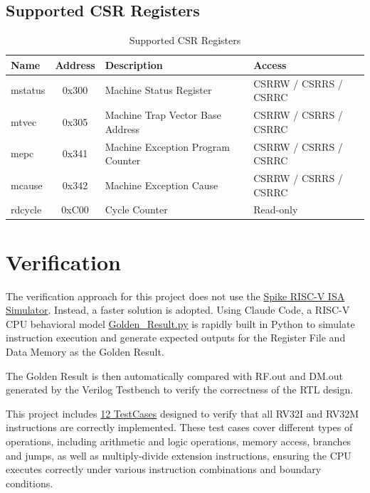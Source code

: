 \documentclass[12pt,a4paper]{report}
\begin{document}
\subsection{Supported CSR Registers}

\begin{table}[htbp]
\centering
\caption{Supported CSR Registers}
\begin{tabular}{|l|c|l|l|}
\hline
\textbf{Name} & \textbf{Address} & \textbf{Description} & \textbf{Access} \\
\hline
mstatus & 0x300 & Machine Status Register & CSRRW / CSRRS / CSRRC \\
\hline
mtvec   & 0x305 & Machine Trap Vector Base Address & CSRRW / CSRRS / CSRRC \\
\hline
mepc    & 0x341 & Machine Exception Program Counter & CSRRW / CSRRS / CSRRC \\
\hline
mcause  & 0x342 & Machine Exception Cause & CSRRW / CSRRS / CSRRC \\
\hline
rdcycle & 0xC00 & Cycle Counter & Read-only \\
\hline
\end{tabular}
\end{table}

\newpage

\section{Verification}

The verification approach for this project does not use the \href{https://github.com/riscv-software-src/riscv-isa-sim}{Spike RISC-V ISA Simulator}. Instead, a faster solution is adopted. Using Claude Code, a RISC-V CPU behavioral model \href{https://github.com/akira2963753/riscv-fpga/blob/main/five-stage-example/Testbench/Golden_Result.py}{Golden\_Result.py} is rapidly built in Python to simulate instruction execution and generate expected outputs for the Register File and Data Memory as the Golden Result.

The Golden Result is then automatically compared with RF.out and DM.out generated by the Verilog Testbench to verify the correctness of the RTL design.

This project includes \href{https://github.com/akira2963753/riscv-fpga/tree/main/five-stage-example/Pattern}{12 TestCases} designed to verify that all RV32I and RV32M instructions are correctly implemented. These test cases cover different types of operations, including arithmetic and logic operations, memory access, branches and jumps, as well as multiply-divide extension instructions, ensuring the CPU executes correctly under various instruction combinations and boundary conditions.
\end{document}
